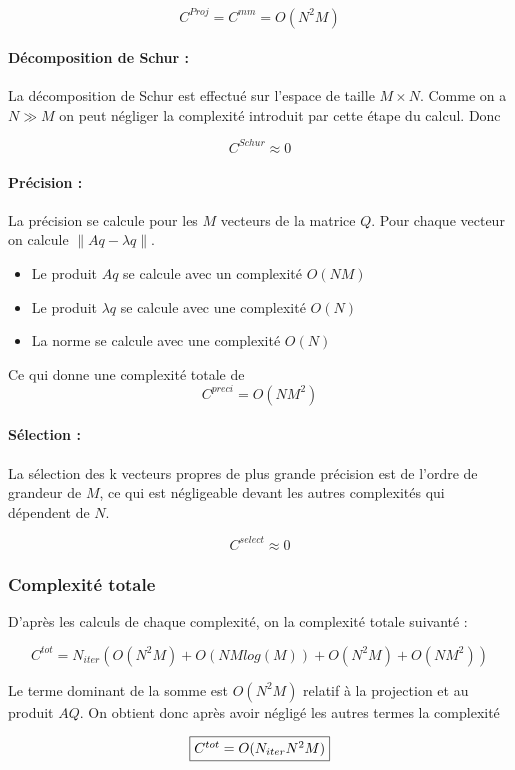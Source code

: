 \documentclass[11pt,a4paper]{article}
\newcommand{\norm}[1]{\left\lVert#1\right\rVert}
\begin{document}
			$$C^{Proj} = C^{mm} = O(N^2M)$$

			\paragraph{Décomposition de Schur :} La décomposition de Schur est effectué sur l'espace de taille $M \times N$. Comme on a $N \gg M$ on peut négliger la complexité introduit par cette étape du calcul. Donc

			$$C^{Schur} \approx 0$$

			\paragraph{Précision :} La précision se calcule pour les $M$ vecteurs de la matrice $Q$. Pour chaque vecteur on calcule $\norm{Aq-\lambda q}$.
			\begin{itemize}
				\item Le produit $Aq$ se calcule avec un complexité $O(NM)$
				\item Le produit $\lambda q$ se calcule avec une complexité $O(N)$
				\item La norme se calcule avec une complexité $O(N)$
			\end{itemize}
			
			Ce qui donne une complexité totale de
			$$C^{preci} = O(NM^2)$$

			\paragraph{Sélection :} La sélection des k vecteurs propres de plus grande précision est de l'ordre de grandeur de $M$, ce qui est négligeable devant les autres complexités qui dépendent de $N$.
			
			$$C^{select} \approx 0$$


		\subsubsection{Complexité totale}
			
			D'après les calculs de chaque complexité, on la complexité totale suivanté :

			$$
			C^{tot} = N_{iter}(O(N^2M) + O(NMlog(M)) + O(N^2M) + O(NM^2))
			$$
			
			Le terme dominant de la somme est $O(N^2M)$ relatif à la projection et au produit $AQ$. On obtient donc après avoir négligé les autres termes la complexité

			$$ 
			\fbox{$C^{tot} = O(N_{iter}N^2M)$}
			$$
\end{document}
